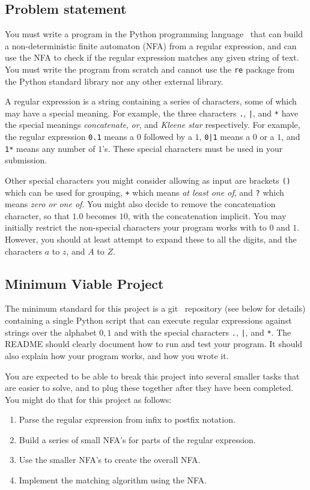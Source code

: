 \documentclass[12pt, a4paper]{article}
\begin{document}
\subsection*{Problem statement}
You must write a program in the Python programming language~\cite{python} that can build a non-deterministic finite automaton (NFA) from a regular expression, and can use the NFA to check if the regular expression matches any given string of text.
You must write the program from scratch and cannot use the \texttt{re} package from the Python standard library nor any other external library.

A regular expression is a string containing a series of characters, some of which may have a special meaning.
For example, the three characters \texttt{.},  \texttt{|}, and \texttt{*} have the special meanings \emph{concatenate}, \emph{or}, and \emph{Kleene star} respectively.
For example, the regular expression \texttt{0.1} means a $0$ followed by a $1$, \texttt{0|1} means a $0$ or a $1$, and \texttt{1*} means any number of $1$'s.
These special characters must be used in your submission.

Other special characters you might consider allowing as input are brackets \texttt{()} which can be used for grouping, \texttt{+} which means \emph{at least one of}, and \texttt{?} which means \emph{zero or one of}. 
You might also decide to remove the concatenation character, so that $1.0$ becomes $10$, with the concatenation implicit.
You may initially restrict the non-special characters your program works with to $0$ and $1$.
However, you should at least attempt to expand these to all the digits, and the characters $a$ to $z$, and $A$ to $Z$.

\subsection*{Minimum Viable Project}

The minimum standard for this project is a git~\cite{git} repository (see below for details) containing a single Python script that can execute regular expressions against strings over the alphabet ${0,1}$ and with the special characters \texttt{.}, \texttt{|}, and \texttt{*}.
The README should clearly document how to run and test your program.
It should also explain how your program works, and how you wrote it.

You are expected to be able to break this project into several smaller tasks that are easier to solve, and to plug these together after they have been completed.
You might do that for this project as follows:
\begin{enumerate}
  \item Parse the regular expression from infix to postfix notation.
  \item Build a series of small NFA's for parts of the regular expression.
  \item Use the smaller NFA's to create the overall NFA.
  \item Implement the matching algorithm using the NFA.
\end{enumerate}
\end{document}
